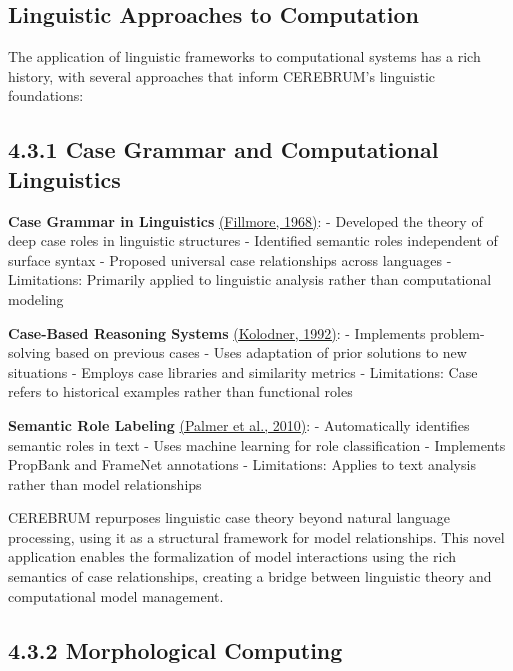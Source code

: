 \documentclass[
  11pt,
  letterpaper,
]{article}
\begin{document}
\hypertarget{linguistic-approaches-to-computation}{%
\subsection{Linguistic Approaches to
Computation}\label{linguistic-approaches-to-computation}}

The application of linguistic frameworks to computational systems has a
rich history, with several approaches that inform CEREBRUM's linguistic
foundations:

\hypertarget{case-grammar-and-computational-linguistics}{%
\subsection{4.3.1 Case Grammar and Computational
Linguistics}\label{case-grammar-and-computational-linguistics}}

\textbf{Case Grammar in Linguistics}
\protect\hyperlink{references}{(Fillmore, 1968)}: - Developed the theory
of deep case roles in linguistic structures - Identified semantic roles
independent of surface syntax - Proposed universal case relationships
across languages - Limitations: Primarily applied to linguistic analysis
rather than computational modeling

\textbf{Case-Based Reasoning Systems}
\protect\hyperlink{references}{(Kolodner, 1992)}: - Implements
problem-solving based on previous cases - Uses adaptation of prior
solutions to new situations - Employs case libraries and similarity
metrics - Limitations: Case refers to historical examples rather than
functional roles

\textbf{Semantic Role Labeling} \protect\hyperlink{references}{(Palmer
et al., 2010)}: - Automatically identifies semantic roles in text - Uses
machine learning for role classification - Implements PropBank and
FrameNet annotations - Limitations: Applies to text analysis rather than
model relationships

CEREBRUM repurposes linguistic case theory beyond natural language
processing, using it as a structural framework for model relationships.
This novel application enables the formalization of model interactions
using the rich semantics of case relationships, creating a bridge
between linguistic theory and computational model management.

\hypertarget{morphological-computing}{%
\subsection{4.3.2 Morphological
Computing}\label{morphological-computing}}
\end{document}
